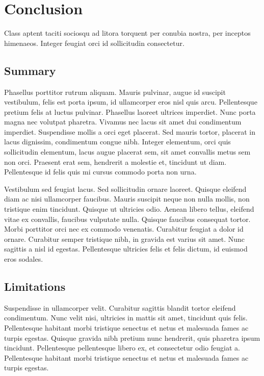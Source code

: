 %
\section{Conclusion}
\label{sec:conclusion}
%

Class aptent taciti sociosqu ad litora torquent per conubia nostra, per inceptos himenaeos. Integer feugiat orci id sollicitudin consectetur.

%
\subsection{Summary}
\label{subsec:summary}
%

Phasellus porttitor rutrum aliquam. Mauris pulvinar, augue id suscipit vestibulum, felis est porta ipsum, id ullamcorper eros nisl quis arcu. Pellentesque pretium felis at luctus pulvinar. Phasellus laoreet ultrices imperdiet. Nunc porta magna nec volutpat pharetra. Vivamus nec lacus sit amet dui condimentum imperdiet. Suspendisse mollis a orci eget placerat. Sed mauris tortor, placerat in lacus dignissim, condimentum congue nibh. Integer elementum, orci quis sollicitudin elementum, lacus augue placerat sem, sit amet convallis metus sem non orci. Praesent erat sem, hendrerit a molestie et, tincidunt ut diam. Pellentesque id felis quis mi cursus commodo porta non urna.

Vestibulum sed feugiat lacus. Sed sollicitudin ornare laoreet. Quisque eleifend diam ac nisi ullamcorper faucibus. Mauris suscipit neque non nulla mollis, non tristique enim tincidunt. Quisque ut ultricies odio. Aenean libero tellus, eleifend vitae ex convallis, faucibus vulputate nulla. Quisque faucibus consequat tortor. Morbi porttitor orci nec ex commodo venenatis. Curabitur feugiat a dolor id ornare. Curabitur semper tristique nibh, in gravida est varius sit amet. Nunc sagittis a nisl id egestas. Pellentesque ultricies felis et felis dictum, id euismod eros sodales.

%
\subsection{Limitations}
\label{subsec:limitations}
%

Suspendisse in ullamcorper velit. Curabitur sagittis blandit tortor eleifend condimentum. Nunc velit nisi, ultricies in mattis sit amet, tincidunt quis felis. Pellentesque habitant morbi tristique senectus et netus et malesuada fames ac turpis egestas. Quisque gravida nibh pretium nunc hendrerit, quis pharetra ipsum tincidunt. Pellentesque pellentesque libero ex, et consectetur odio feugiat a. Pellentesque habitant morbi tristique senectus et netus et malesuada fames ac turpis egestas.
